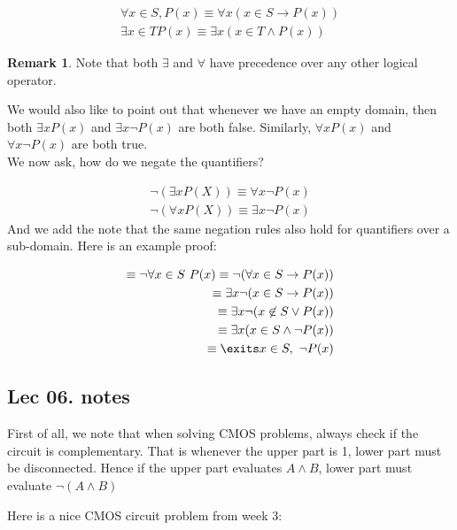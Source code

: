 \documentclass[titlepage]{article}
\theoremstyle{definition}
\newtheorem{remark}{Remark}
\numberwithin{equation}{subsection}
\numberwithin{remark}{subsection}
\begin{document}
\begin{align}
    \forall x \in S, P(x) \equiv \forall x(x\in S \rightarrow P(x))\\
    \exists x \in T P(x) \equiv \exists x( x\in T \land P(x))
\end{align}

\begin{remark}
Note that both $\exists$ and $\forall$ have precedence over any other logical operator. 
\end{remark}

We would also like to point out that whenever we have an empty domain, then both $\exists x P(x)$ and $\exists x \neg P(x)$ are both false. Similarly, $\forall x P(x)$ and $\forall x \neg P(x)$ are both true. 
\\
We now ask, how do we negate the quantifiers?

\begin{align}
    \neg(\exists x P(X)) \equiv \forall x \neg P(x)\\
    \neg(\forall x P(X)) \equiv \exists x \neg P(x) 
\end{align}
And we add the note that the same negation rules also hold for quantifiers over a sub-domain. Here is an example proof:

\begin{align*}
    \equiv \neg \forall x \in S \ P(x) \equiv \neg (\forall x \in S \rightarrow P(x))\\
    \equiv \exists x \neg(x \in S \rightarrow P(x))\\
    \equiv \exists x \neg(x \not \in S \lor P(x))\\
    \equiv \exists x (x \in S \land \neg P(x))\\
    \equiv \exits x \in S, \ \neg P(x)
\end{align*}

\subsection{Lec 06. notes}

First of all, we note that when solving CMOS problems, always check if the circuit is complementary. That is whenever the upper part is 1, lower part must be disconnected. Hence if the upper part evaluates $A\land B$, lower part must evaluate $\neg(A \land B)$

Here is a nice CMOS circuit problem from week 3:
\end{document}
